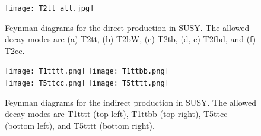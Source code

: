 \begin{figure}[!h]
	\begin{center}
		\texttt{[image: T2tt\_all.jpg]}
	\end{center}
	\caption[Direct stop production]{Feynman diagrams for the direct \st{} production in SUSY. The allowed decay modes are (a) T2tt, (b) T2bW, (c) T2tb, (d, e) T2fbd, and (f) T2cc. }
	\label{fig:stop-direct-production}
\end{figure}

\begin{figure}[!h]
	\begin{center}
		\texttt{[image: T1tttt.png]}
		\texttt{[image: T1ttbb.png]} \\
		\texttt{[image: T5ttcc.png]}
		\texttt{[image: T5tttt.png]} \\
	\end{center}
	\caption[Gluino mediated stop production]{Feynman diagrams for the indirect \st{} production in SUSY. The allowed decay modes are T1tttt (top left), T1ttbb (top right), T5ttcc (bottom left), and T5tttt (bottom right).
	}
	\label{fig:stop-gluino-production}
\end{figure}
